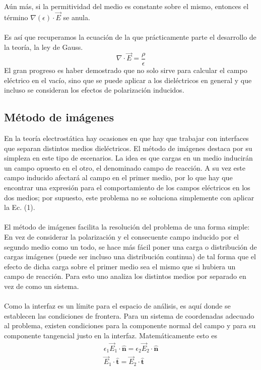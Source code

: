 \documentclass[12pt, notitlepage]{article}
\numberwithin{equation}{section}
\begin{document}
Aún más, si la permitividad del medio es constante sobre el mismo, entonces el término $\nabla (\epsilon)\cdot\vec{E}$ se anula.\\\\
Es así que recuperamos la ecuación de la que prácticamente parte el desarrollo de la teoría, la ley de Gauss.
\begin{equation}
\nabla\cdot\vec{E} = \frac{\rho}{\epsilon}
\end{equation}
El gran progreso es haber demostrado que no solo sirve para calcular el campo eléctrico en el vacío, sino que se puede aplicar a los dieléctricos en general y que incluso se consideran los efectos de polarización inducidos.

\subsection{Método de imágenes}
En la teoría electrostática hay ocasiones en que hay que trabajar con interfaces que separan distintos medios dieléctricos. El método de imágenes destaca por su simpleza en este tipo de escenarios. La idea es que cargas en un medio inducirán un campo opuesto en el otro, el denominado campo de reacción. A su vez este campo inducido afectará al campo en el primer medio, por lo que hay que encontrar una expresión para el comportamiento de los campos eléctricos en los dos medios; por supuesto, este problema no se soluciona simplemente con aplicar la Ec. (1).\\\\
El método de imágenes facilita la resolución del problema de una forma simple: En vez de considerar la polarización y el consecuente campo inducido por el segundo medio como un todo, se hace más fácil poner una carga o distribución de cargas imágenes (puede ser incluso una distribución continua) de tal forma que el efecto de dicha carga sobre el primer medio sea el mismo que si hubiera un campo de reacción. Para esto uno analiza los distintos medios por separado en vez de como un sistema.\\\\
Como la interfaz es un límite para el espacio de análisis, es aquí donde se establecen las condiciones de frontera. Para un sistema de coordenadas adecuado al problema, existen condiciones para la componente normal del campo y para su componente tangencial justo en la interfaz. Matemáticamente esto es
\begin{gather}
\epsilon_1\vec{E}_1\cdot\hat{\mathbf{n}} = \epsilon_2\vec{E}_2\cdot\hat{\mathbf{n}}\\
\vec{E}_1\cdot\hat{\mathbf{t}} = \vec{E}_2\cdot\hat{\mathbf{t}}
\end{gather}
\end{document}
